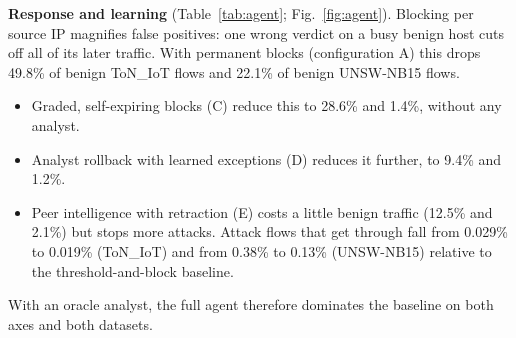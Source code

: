 \textbf{Response and learning} (Table~\ref{tab:agent};
Fig.~\ref{fig:agent}). Blocking per source IP magnifies false positives: one
wrong verdict on a busy benign host cuts off all of its later traffic. With
permanent blocks (configuration A) this drops 49.8\% of benign ToN\_IoT flows
and 22.1\% of benign UNSW-NB15 flows.
\begin{itemize}
\item Graded, self-expiring blocks (C) reduce this to 28.6\% and 1.4\%,
without any analyst.
\item Analyst rollback with learned exceptions (D) reduces it further, to 9.4\% and 1.2\%.
\item Peer intelligence with retraction (E) costs a little benign traffic
(12.5\% and 2.1\%) but stops more attacks. Attack flows that get through fall
from 0.029\% to 0.019\% (ToN\_IoT) and from 0.38\% to 0.13\% (UNSW-NB15)
relative to the threshold-and-block baseline.
\end{itemize}
With an oracle analyst, the full agent therefore dominates the baseline on
both axes and both datasets.

\begin{table}[t]\centering
\caption{Four-agent stream simulation (3 seeds; EC2; oracle analyst). Dropped = benign flows refused by an active block; unblocked = attack flows not blocked or dropped. ToN\_IoT uses real source IPs; UNSW-NB15 uses synthetic sessions.}
\label{tab:agent}
\end{table}

